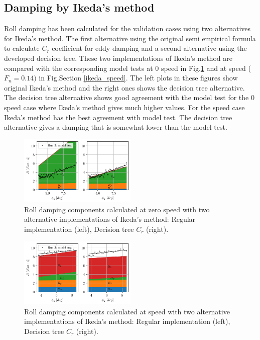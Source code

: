 \subsection*{Damping by Ikeda's method}\label{damping-by-ikedas-method}
Roll damping has been calculated for the validation cases using two
alternatives for Ikeda's method. The first alternative using the
original semi empirical formula to calculate $C_r$ coefficient for
eddy damping and a second alternative using the developed decision tree.
These two implementations of Ikeda's method are compared with the
corresponding model tests at 0 speed in Fig.\ref{fig:ikeda} and
at speed ($F_n=0.14)$ in Fig.Section \ref{ikeda_speed}. The left plots
in these figures show original Ikeda's method and the right ones shows
the decision tree alternative. The decision tree alternative shows good
agreement with the model test for the 0 speed case where Ikeda's method
gives much higher values. For the speed case Ikeda's method has the best
agreement with model test. The decision tree alternative gives a damping
that is somewhat lower than the model test.
\begin{figure}[H]
\begin{center}\includegraphics[width = 0.5\textwidth]{figures/ikeda.pdf}\end{center}
\vspace{-1cm}
\caption{Roll damping components calculated at zero speed with two alternative implementations of Ikeda's method: Regular implementation (left), Decision tree $C_r$ (right).}
\label{fig:ikeda}
\end{figure}
\begin{figure}[H]
\begin{center}\includegraphics[width = 0.5\textwidth]{figures/ikeda_speed.pdf}\end{center}
\vspace{-1cm}
\caption{Roll damping components calculated at speed with two alternative implementations of Ikeda's method: Regular implementation (left), Decision tree $C_r$ (right).}
\label{fig:ikeda_speed}
\end{figure}
